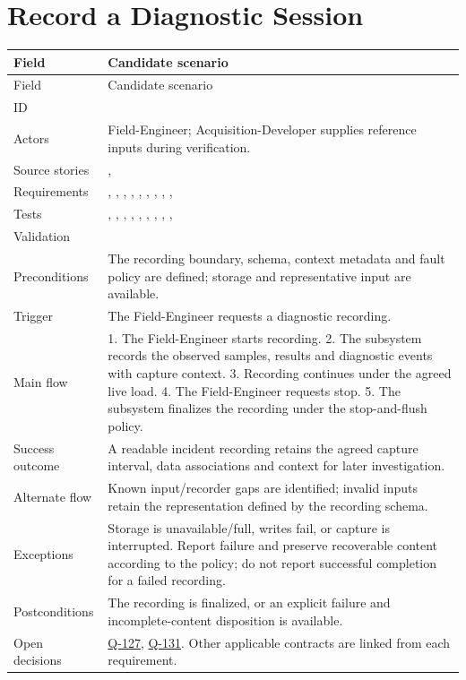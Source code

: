 \section{Record a Diagnostic Session}
\par\medskip
\small
\begin{tabularx}{\linewidth}{L{2.8cm}Y}
\caption{Record a Diagnostic Session\label{Table:UC-03}}\\
\toprule
Field & Candidate scenario\\\midrule
\endfirsthead
\toprule
Field & Candidate scenario\\\midrule
\endhead
\bottomrule
\endlastfoot
ID & \\
Actors & Field-Engineer; Acquisition-Developer supplies reference inputs during verification.\\
Source stories & , \\
Requirements & , , , , , , , , , \\
Tests & , , , , , , , , , \\
Validation & \\
Preconditions & The recording boundary, schema, context metadata and fault policy are defined; storage and representative input are available.\\
Trigger & The Field-Engineer requests a diagnostic recording.\\
Main flow & 1. The Field-Engineer starts recording. 2. The subsystem records the observed samples, results and diagnostic events with capture context. 3. Recording continues under the agreed live load. 4. The Field-Engineer requests stop. 5. The subsystem finalizes the recording under the stop-and-flush policy.\\
Success outcome & A readable incident recording retains the agreed capture interval, data associations and context for later investigation.\\
Alternate flow & Known input/recorder gaps are identified; invalid inputs retain the representation defined by the recording schema.\\
Exceptions & Storage is unavailable/full, writes fail, or capture is interrupted. Report failure and preserve recoverable content according to the policy; do not report successful completion for a failed recording.\\
Postconditions & The recording is finalized, or an explicit failure and incomplete-content disposition is available.\\
Open decisions & \hyperref[Question:Q-127]{Q-127}, \hyperref[Question:Q-131]{Q-131}. Other applicable contracts are linked from each requirement.\\
\end{tabularx}
